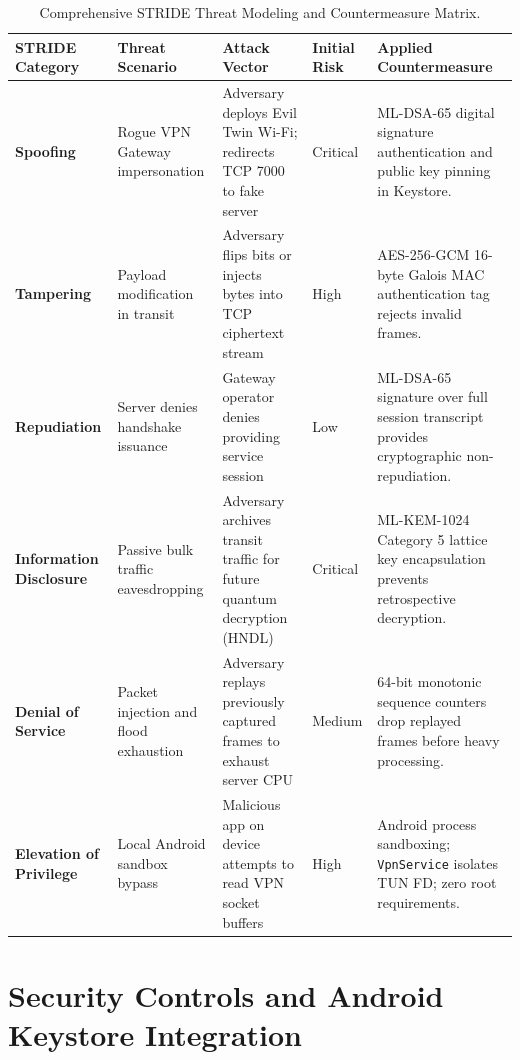 \begin{table}[htbp]
  \centering
  \footnotesize
  \caption{Comprehensive STRIDE Threat Modeling and Countermeasure Matrix.}
  \label{tab:stride_matrix}
  \begin{tabular}{@{}P{2.0cm}P{3.4cm}P{3.8cm}P{2.0cm}P{3.4cm}@{}}
    \toprule
    \textbf{STRIDE Category} & \textbf{Threat Scenario} & \textbf{Attack Vector} & \textbf{Initial Risk} & \textbf{Applied Countermeasure} \\
    \midrule
    \textbf{Spoofing} & Rogue VPN Gateway impersonation & Adversary deploys Evil Twin Wi-Fi; redirects TCP 7000 to fake server & Critical & ML-DSA-65 digital signature authentication and public key pinning in Keystore. \\
    \addlinespace
    \textbf{Tampering} & Payload modification in transit & Adversary flips bits or injects bytes into TCP ciphertext stream & High & AES-256-GCM 16-byte Galois MAC authentication tag rejects invalid frames. \\
    \addlinespace
    \textbf{Repudiation} & Server denies handshake issuance & Gateway operator denies providing service session & Low & ML-DSA-65 signature over full session transcript provides cryptographic non-repudiation. \\
    \addlinespace
    \textbf{Information Disclosure} & Passive bulk traffic eavesdropping & Adversary archives transit traffic for future quantum decryption (HNDL) & Critical & ML-KEM-1024 Category 5 lattice key encapsulation prevents retrospective decryption. \\
    \addlinespace
    \textbf{Denial of Service} & Packet injection and flood exhaustion & Adversary replays previously captured frames to exhaust server CPU & Medium & 64-bit monotonic sequence counters drop replayed frames before heavy processing. \\
    \addlinespace
    \textbf{Elevation of Privilege} & Local Android sandbox bypass & Malicious app on device attempts to read VPN socket buffers & High & Android process sandboxing; \texttt{VpnService} isolates TUN FD; zero root requirements. \\
    \bottomrule
  \end{tabular}
\end{table}

\section{Security Controls and Android Keystore Integration}
\label{sec:keystore_security_controls}

